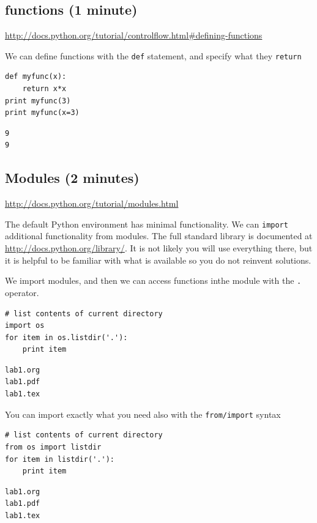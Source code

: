 \documentclass[11pt]{article}
\begin{document}
\subsection{functions (1 minute)}
\label{sec-3-6}
\url{http://docs.python.org/tutorial/controlflow.html#defining-functions}

We can define functions with the \texttt{def} statement, and specify what they \texttt{return}
\begin{verbatim}
def myfunc(x):
    return x*x
print myfunc(3)
print myfunc(x=3)
\end{verbatim}

\begin{verbatim}
9
9
\end{verbatim}


\subsection{Modules (2 minutes)}
\label{sec-3-7}
\url{http://docs.python.org/tutorial/modules.html}

The default Python environment has minimal functionality. We can \texttt{import} additional functionality from modules. The full standard library is documented at \url{http://docs.python.org/library/}. It is not likely you will use everything there, but it is helpful to be familiar with what is available so you do not reinvent solutions.

We import modules, and then we can access functions inthe module with the \texttt{.} operator.

\begin{verbatim}
# list contents of current directory
import os
for item in os.listdir('.'):
    print item
\end{verbatim}

\begin{verbatim}
lab1.org
lab1.pdf
lab1.tex
\end{verbatim}

You can import exactly what you need also with the \texttt{from/import} syntax
\begin{verbatim}
# list contents of current directory
from os import listdir
for item in listdir('.'):
    print item
\end{verbatim}

\begin{verbatim}
lab1.org
lab1.pdf
lab1.tex
\end{verbatim}
\end{document}
